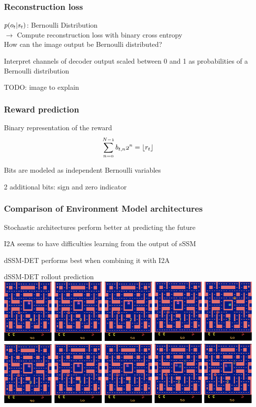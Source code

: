 \begin{frame}
	\frametitle{Reconstruction loss}
	$\mathnormal{p(o_t|s_t)}$: Bernoulli Distribution \\
        $\rightarrow$ Compute reconstruction loss with binary cross entropy\\
        \vspace{10mm}
	How can the image output be Bernoulli distributed?
        \begin{PraesentationAufzaehlung}
        	\item Interpret channels of decoder output scaled between 0 and 1 as probabilities of a Bernoulli distribution
        	
        \end{PraesentationAufzaehlung}
        TODO: image to explain
\end{frame}

\begin{frame}
	\frametitle{Reward prediction}
	\begin{PraesentationAufzaehlung}
		\item Binary representation of the reward
		\begin{equation}
			\mathnormal{
			\sum_{n=0}^{N-1}b_{t,n}2^n = \lfloor r_t \rfloor
			}
		\end{equation}
		\item Bits are modeled as independent Bernoulli variables
		\item 2 additional bits: sign and zero indicator
	\end{PraesentationAufzaehlung}
\end{frame}


\begin{frame}
	\frametitle{Comparison of Environment Model architectures}
	\begin{PraesentationAufzaehlung}
		\item Stochastic architectures perform better at predicting the future\\
		\item I2A seems to have difficulties learning from the output of sSSM
		\item dSSM-DET performs best when combining it with I2A
	\end{PraesentationAufzaehlung}
\end{frame}




\begin{frame}{dSSM-DET rollout prediction}
    \includegraphics[width=\textwidth]{./latent_i2a_images/dSSM_rollout_prediction.png}
\end{frame}

